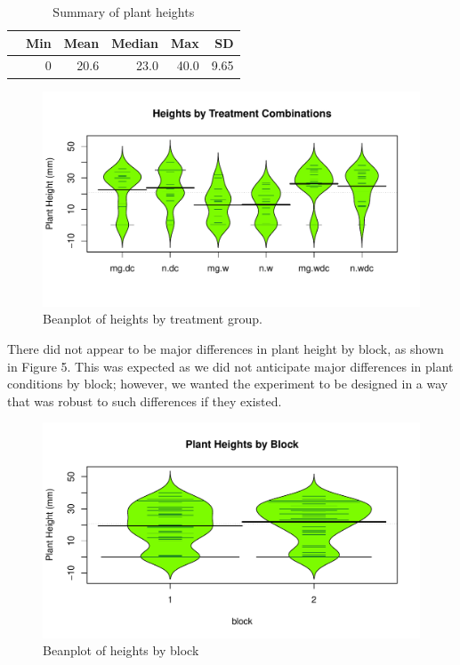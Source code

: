 \documentclass[1p,12pt]{elsarticle}\usepackage[]{graphicx}\usepackage[]{color}
\makeatletter
\def\maxwidth{ %
  \ifdim\Gin@nat@width>\linewidth
    \linewidth
  \else
    \Gin@nat@width
  \fi
}
\newenvironment{knitrout}{}{} %
\makeatother
\begin{document}
\begin{table}[ht]
\centering
\begin{tabular}{rrrrrr}
  \hline
 & Min & Mean & Median & Max & SD \\ 
  \hline
 & 0 & 20.6 & 23.0 & 40.0 & 9.65\\ 
  
   \hline
\end{tabular}
\caption{Summary of plant heights}
\end{table}

\begin{knitrout}
\color{fgcolor}\begin{figure}
\includegraphics[width=\maxwidth]{figure/eda-1} \caption[Beanplot of heights by treatment group]{Beanplot of heights by treatment group.}\label{fig:eda}
\end{figure}


\end{knitrout}

There did not appear to be major differences in plant height by block, as shown in Figure 5. This was expected as we did not anticipate major differences in plant conditions by block; however, we wanted the experiment to be designed in a way that was robust to such differences if they existed. 

\begin{knitrout}
\color{fgcolor}\begin{figure}
\includegraphics[width=\maxwidth]{figure/block_bean-1} \caption[Beanplot of heights by block]{Beanplot of heights by block}\label{fig:block_bean}
\end{figure}


\end{knitrout}
\end{document}
